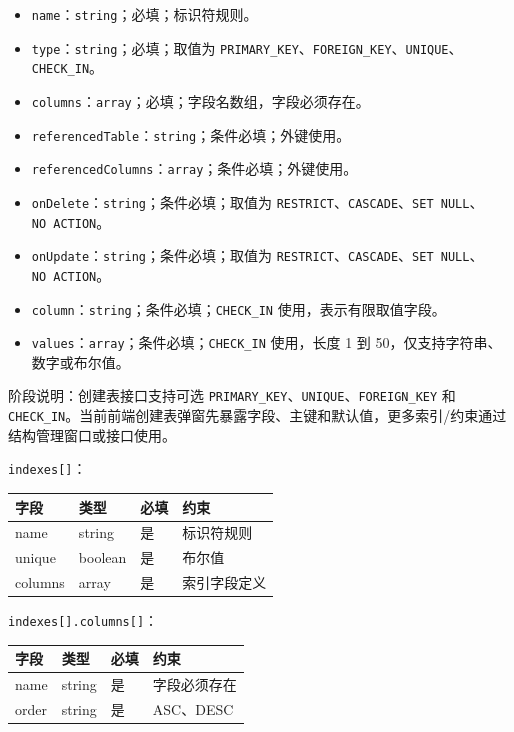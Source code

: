 \documentclass[
  a4paper,
  UTF8]{ctexart}
\providecommand{\tightlist}{%
  \setlength{\itemsep}{0pt}\setlength{\parskip}{0pt}}
\begin{document}
\begin{itemize}
\tightlist
\item
  \texttt{name}：\texttt{string}；必填；标识符规则。
\item
  \texttt{type}：\texttt{string}；必填；取值为
  \texttt{PRIMARY\_KEY}、\texttt{FOREIGN\_KEY}、\texttt{UNIQUE}、\texttt{CHECK\_IN}。
\item
  \texttt{columns}：\texttt{array}；必填；字段名数组，字段必须存在。
\item
  \texttt{referencedTable}：\texttt{string}；条件必填；外键使用。
\item
  \texttt{referencedColumns}：\texttt{array}；条件必填；外键使用。
\item
  \texttt{onDelete}：\texttt{string}；条件必填；取值为
  \texttt{RESTRICT}、\texttt{CASCADE}、\texttt{SET\ NULL}、\texttt{NO\ ACTION}。
\item
  \texttt{onUpdate}：\texttt{string}；条件必填；取值为
  \texttt{RESTRICT}、\texttt{CASCADE}、\texttt{SET\ NULL}、\texttt{NO\ ACTION}。
\item
  \texttt{column}：\texttt{string}；条件必填；\texttt{CHECK\_IN}
  使用，表示有限取值字段。
\item
  \texttt{values}：\texttt{array}；条件必填；\texttt{CHECK\_IN}
  使用，长度 1 到 50，仅支持字符串、数字或布尔值。
\end{itemize}

阶段说明：创建表接口支持可选
\texttt{PRIMARY\_KEY}、\texttt{UNIQUE}、\texttt{FOREIGN\_KEY} 和
\texttt{CHECK\_IN}。当前前端创建表弹窗先暴露字段、主键和默认值，更多索引/约束通过结构管理窗口或接口使用。

\texttt{indexes{[}{]}}：

\begin{longtable}[]{@{}llll@{}}
\toprule
字段 & 类型 & 必填 & 约束 \\
\midrule
\endhead
name & string & 是 & 标识符规则 \\
unique & boolean & 是 & 布尔值 \\
columns & array & 是 & 索引字段定义 \\
\bottomrule
\end{longtable}

\texttt{indexes{[}{]}.columns{[}{]}}：

\begin{longtable}[]{@{}llll@{}}
\toprule
字段 & 类型 & 必填 & 约束 \\
\midrule
\endhead
name & string & 是 & 字段必须存在 \\
order & string & 是 & ASC、DESC \\
\bottomrule
\end{longtable}
\end{document}
